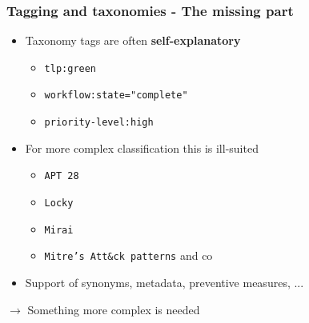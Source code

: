 \begin{frame}
\frametitle{Tagging and taxonomies - The missing part}
\begin{itemize}
    \item Taxonomy tags are often {\bf self-explanatory}
    \begin{itemize}
        \item \texttt{tlp:green}
        \item \texttt{workflow:state="complete"}
        \item \texttt{priority-level:high}
    \end{itemize}
\end{itemize}
\vspace{1em}

\begin{itemize}
    \item For more complex classification this is ill-suited
    \begin{itemize}
        \item \texttt{APT 28}
        \item \texttt{Locky}
        \item \texttt{Mirai}
        \item \texttt{Mitre's Att\&ck patterns} and co
    \end{itemize}
    \item Support of synonyms, metadata, preventive measures, ... 
\end{itemize}

\begin{center}
    $\rightarrow$ Something more complex is needed
\end{center}
\end{frame}



